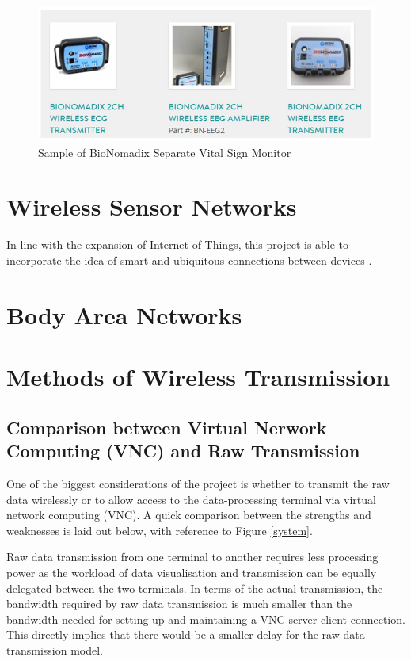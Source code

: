 \begin{figure}[H]
	\centering
	\includegraphics[width=\linewidth]{lit5.jpg}
	\caption{Sample of BioNomadix Separate Vital Sign Monitor \cite{lit10}}
	\label{literaturereview5}
\end{figure}






\section{Wireless Sensor Networks}

In line with the expansion of Internet of Things, this project is able to incorporate the idea of smart and ubiquitous connections between devices \cite{gubbi2013internet}.

\section{Body Area Networks}

\section{Methods of Wireless Transmission}

\subsection{Comparison between Virtual Nerwork Computing (VNC) and Raw Transmission}
\label{vnc}

One of the biggest considerations of the project is whether to transmit the raw data wirelessly or to allow access to the data-processing terminal via virtual network computing (VNC). A quick comparison between the strengths and weaknesses is laid out below, with reference to Figure \ref{system}. 

Raw data transmission from one terminal to another requires less processing power as the workload of data visualisation and transmission can be equally delegated between the two terminals. In terms of the actual transmission, the bandwidth required by raw data transmission is much smaller than the bandwidth needed for setting up and maintaining a VNC server-client connection. This directly implies that there would be a smaller delay for the raw data transmission model. 

